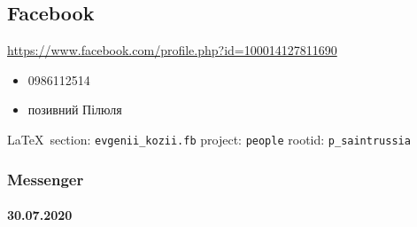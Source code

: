  
 
\subsection{Facebook}
\url{https://www.facebook.com/profile.php?id=100014127811690}

\begin{itemize}
\item 0986112514
\item позивний Пілюля
\end{itemize}
  
\vspace{0.5cm}
 {\ifDEBUG\small\LaTeX~section: \verb|evgenii_kozii.fb| project: \verb|people| rootid: \verb|p_saintrussia|	\fi}
\vspace{0.5cm}

\subsubsection{Messenger}

\paragraph{30.07.2020}

\def\itemek#1{\item\blue #1}
\def\itemap{\item\red}

